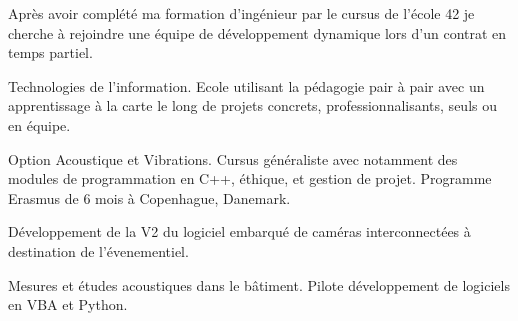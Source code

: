 \documentclass[10pt,a4paper]{altacv}
\begin{document}


\begin{fullwidth}
\makecvheader
\begin{adjustwidth}{30pt}{30pt}
Après avoir complété ma formation d'ingénieur par le cursus de l'\'ecole 42 je cherche \`a rejoindre une \'equipe de d\'eveloppement dynamique lors d'un contrat en temps partiel.
\end{adjustwidth}
\end{fullwidth}




Technologies de l'information.\linebreak
Ecole utilisant la p\'edagogie pair \`a pair avec un apprentissage \`a la carte le long de projets concrets, professionnalisants, seuls ou en \'equipe.
\divider

Option Acoustique et Vibrations.\linebreak
Cursus g\'en\'eraliste avec notamment des modules de programmation en C++, \'ethique, et gestion de projet. Programme Erasmus de 6 mois \`a Copenhague, Danemark.


D\'eveloppement de la V2 du logiciel embarqu\'e de cam\'eras interconnect\'ees \`a destination de l'\'evenementiel.
\divider

Mesures et \'etudes acoustiques dans le b\^atiment. Pilote d\'eveloppement de logiciels en VBA et Python.
\divider
\end{document}
